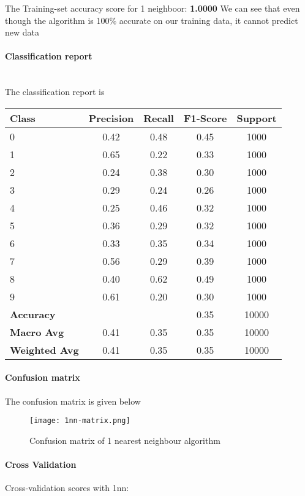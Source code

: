 \documentclass{article}
\begin{document}
The Training-set accuracy score for 1 neighboor:\textbf{ 1.0000}
We can see that even though the algorithm is 100\% accurate on our training data, it cannot predict new data 

\paragraph{Classification report}

\\The classification report is 

\begin{tabular}{lcccc}
\toprule
\textbf{Class} & \textbf{Precision} & \textbf{Recall} & \textbf{F1-Score} & \textbf{Support} \\
\midrule
0 & 0.42 & 0.48 & 0.45 & 1000 \\
1 & 0.65 & 0.22 & 0.33 & 1000 \\
2 & 0.24 & 0.38 & 0.30 & 1000 \\
3 & 0.29 & 0.24 & 0.26 & 1000 \\
4 & 0.25 & 0.46 & 0.32 & 1000 \\
5 & 0.36 & 0.29 & 0.32 & 1000 \\
6 & 0.33 & 0.35 & 0.34 & 1000 \\
7 & 0.56 & 0.29 & 0.39 & 1000 \\
8 & 0.40 & 0.62 & 0.49 & 1000 \\
9 & 0.61 & 0.20 & 0.30 & 1000 \\
\midrule
\textbf{Accuracy} & & & 0.35 & 10000 \\
\textbf{Macro Avg} & 0.41 & 0.35 & 0.35 & 10000 \\
\textbf{Weighted Avg} & 0.41 & 0.35 & 0.35 & 10000 \\
\bottomrule
\end{tabular}

\paragraph{Confusion matrix}
The confusion matrix is given below 
\begin{figure}[h!]
    \centering
    \texttt{[image: 1nn-matrix.png]}
    \caption{Confusion matrix of 1 nearest neighbour algorithm}
    \label{fig:1_neighbour_algorithm}
\end{figure}

\paragraph{Cross Validation}
Cross-validation scores with 1nn:
\end{document}
